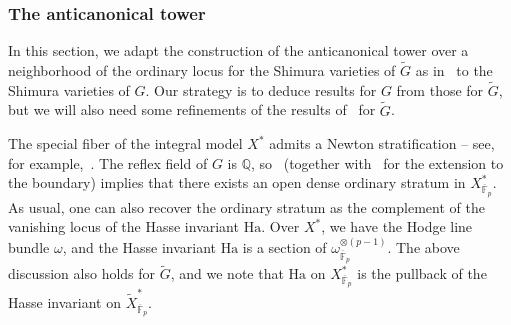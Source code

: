 \documentclass{amsart}
\theoremstyle{remark}
\numberwithin{equation}{subsection}
\newcommand{\F}{\FF}
\newcommand{\Q}{\QQ}
\newcommand{\FF}{{\mathbb F}}
\newcommand{\QQ}{{\mathbb Q}}
\newcommand{\Ha}{\mathrm{Ha}}
\newcommand{\tG}{\widetilde{G}}
\newcommand{\ol}{\overline}
\newcommand{\wt}{\widetilde}
\renewcommand{\(}{\left(}
\renewcommand{\)}{\right)}
\begin{document}
\subsubsection{The anticanonical tower}\label{sec: anticanonical} In this section, we adapt the construction of the anticanonical tower over a neighborhood of the ordinary locus for the Shimura varieties of $\tG$ as in~\cite[Sec.~3]{scholze-galois} to the Shimura varieties of $G$. Our strategy is to deduce results for $G$ from those for $\tG$, but we will also need some refinements of the results of~\cite[Sec.~3]{scholze-galois} for $\tG$.

\medskip

The special fiber of the integral model $X^\ast$ admits a Newton stratification -- see, for example,~\cite[\S 3.3]{lan-stroh}. The reflex field of $G$ is $\Q$, so~\cite[Thm.\ 1.6.3]{wedhorn-thesis} 
(together with~\cite[\S 3.3]{lan-stroh} for the extension to the boundary) implies that there exists an open dense ordinary stratum in $X^*_{\overline{\mathbb{F}}_p}$. As usual, one can also recover the ordinary stratum as the complement of the vanishing locus of 
the Hasse invariant $\Ha$. Over $X^\ast$, we have the Hodge line bundle $\omega$, and the Hasse invariant $\Ha$ is a section of $\omega_{\overline{\mathbb{F}}_p}^{\otimes (p-1)}$. The above discussion also holds for $\tG$, and we note that $\Ha$ on $X^{\ast}_{\ol{\F}_{p}}$ is the pullback of the Hasse invariant on $\wt{X}^{\ast}_{\ol{\F}_{p}}$.

\medskip
\end{document}
